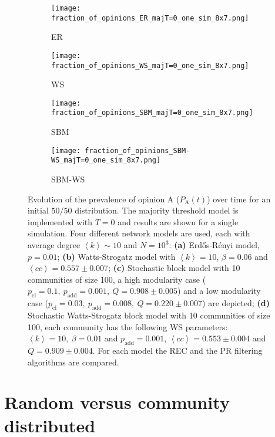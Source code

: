 \documentclass[11 pt , letterpaper , twoside , openright]{book}
\begin{document}
\begin{figure}[H]
  \begin{subfigure}[b]{0.49\textwidth}
    \caption{ER}
  	\texttt{[image: fraction\_of\_opinions\_ER\_majT=0\_one\_sim\_8x7.png]}
    \label{er_majT}
  \end{subfigure}
  \begin{subfigure}[b]{0.49\textwidth}
    \caption{WS}
  	\texttt{[image: fraction\_of\_opinions\_WS\_majT=0\_one\_sim\_8x7.png]}
    \label{ws_majT}
  \end{subfigure}
  \begin{subfigure}[b]{0.49\textwidth}
    \caption{SBM}
    \texttt{[image: fraction\_of\_opinions\_SBM\_majT=0\_one\_sim\_8x7.png]}
    \label{sbm_majT}
  \end{subfigure}
  \begin{subfigure}[b]{0.49\textwidth}
    \caption{SBM-WS}
    \texttt{[image: fraction\_of\_opinions\_SBM-WS\_majT=0\_one\_sim\_8x7.png]}
    \label{sbm-ws_majT}
  \end{subfigure}
  \captionsetup{format=plain}
  \caption[Evolution of the prevalence of opinion A ($P_\text{A}(t)$) over time for an initial $50/50$ opinion distribution. Results for one simulation of the majority threshold model with $T=0$.]{Evolution of the prevalence of opinion A ($P_\text{A}(t)$) over time for an initial $50/50$ distribution. The majority threshold model is implemented with $T=0$ and results are shown for a single simulation. Four different network models are used, each with average degree $\left<k\right> \sim 10$ and $N = 10^3$: \textbf{(a)} Erd\H{o}s-R\'{e}nyi model, $p=0.01$; \textbf{(b)} Watts-Strogatz model with $\left<k\right> = 10$, $\beta = 0.06$ and $\left<cc\right> = 0.557 \pm 0.007$; \textbf{(c)} Stochastic block model with 10 communities of size 100, a high modularity case ($p_{\text{cl}} = 0.1,\ p_{\text{add}} = 0.001,\ Q = 0.908 \pm 0.005$) and a low modularity case ($p_{\text{cl}} = 0.03,\ p_{\text{add}} = 0.008,\ Q = 0.220 \pm 0.007$) are depicted; \textbf{(d)} Stochastic Watts-Strogatz block model with 10 communities of size 100, each community has the following WS parameters: $\left<k\right> = 10,\ \beta = 0.01$ and $p_{\text{add}} = 0.001$, $\left<cc\right> = 0.553 \pm 0.004$ and $Q = 0.909 \pm 0.004$. For each model the REC and the PR filtering algorithms are compared.}
\label{ev_op_majT_one_sim}
\end{figure}

\section{Random versus community distributed}
\end{document}
